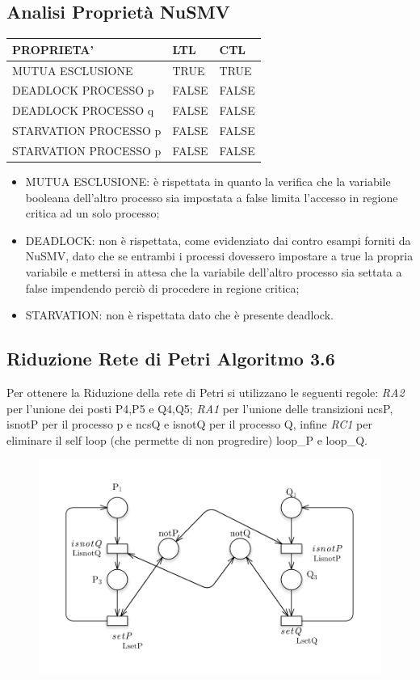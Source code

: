 \documentclass{article}
\begin{document}
\subsection{Analisi Proprietà NuSMV}
\begin{tabular}{|p{6cm}||p{3cm}|p{3cm}|}
\hline
PROPRIETA' & LTL & CTL\\
\hline
 MUTUA ESCLUSIONE&TRUE&TRUE \\
 DEADLOCK PROCESSO p&FALSE&FALSE\\
 DEADLOCK PROCESSO q&FALSE&FALSE\\
 STARVATION PROCESSO p&FALSE&FALSE\\
 STARVATION PROCESSO p&FALSE&FALSE\\
\hline
\end{tabular}
\begin{itemize}
    \item MUTUA ESCLUSIONE: è rispettata in quanto la verifica che la variabile booleana dell'altro processo sia impostata a false limita l'accesso in regione critica ad un solo processo;
    \item DEADLOCK: non è rispettata, come evidenziato dai contro esampi forniti da NuSMV, dato che se entrambi i processi dovessero impostare a true la propria variabile e mettersi in attesa che la variabile dell'altro processo sia settata a false impendendo perciò di procedere in regione critica;
    \item STARVATION: non è rispettata dato che è presente deadlock.
\end{itemize}
\subsection{Riduzione Rete di Petri Algoritmo 3.6}
Per ottenere la Riduzione della rete di Petri si utilizzano le seguenti regole: \textit{RA2} per l'unione dei posti P4,P5 e Q4,Q5;  \textit{RA1} per l'unione delle transizioni ncsP, isnotP per il processo p e ncsQ e isnotQ per il processo Q, infine \textit{RC1} per eliminare il self loop (che permette di non progredire) loop\_P e loop\_Q.
\begin{figure}[h] 
\centering
\includegraphics[scale=0.5]{Riduzione3.6.png}
\end{figure}
\clearpage
\end{document}
